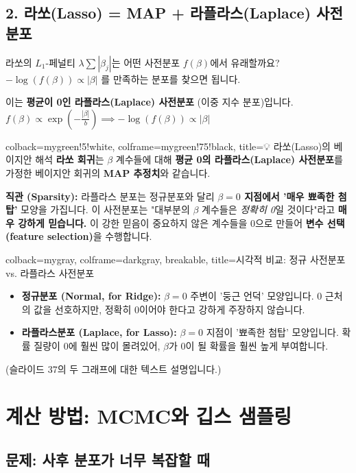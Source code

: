 \documentclass[11pt,a4paper]{book}
\theoremstyle{definition}
\begin{document}
\subsection{2. 라쏘(Lasso) = MAP + 라플라스(Laplace) 사전분포}

라쏘의 $L_1$-페널티 $\lambda \sum |\beta_j|$는 어떤 사전분포 $f(\beta)$에서 유래할까요?
$-\log(f(\beta)) \propto |\beta|$ 를 만족하는 분포를 찾으면 됩니다.

이는 \textbf{평균이 0인 라플라스(Laplace) 사전분포} (이중 지수 분포)입니다.
$f(\beta) \propto \exp(-\frac{|\beta|}{b}) \implies -\log(f(\beta)) \propto |\beta|$

\begin{tcolorbox}{colback=mygreen!5!white, colframe=mygreen!75!black, title=💡 라쏘(Lasso)의 베이지안 해석}
    \textbf{라쏘 회귀}는 $\beta$ 계수들에 대해 \textbf{평균 0의 라플라스(Laplace) 사전분포}를 가정한
    베이지안 회귀의 \textbf{MAP 추정치}와 같습니다.
    
    \textbf{직관 (Sparsity):} 라플라스 분포는 정규분포와 달리 \textbf{$\beta=0$ 지점에서 '매우 뾰족한 첨탑'} 모양을 가집니다.
    이 사전분포는 "대부분의 $\beta$ 계수들은 \textit{정확히 0}일 것이다"라고 \textbf{매우 강하게 믿습니다.}
    이 강한 믿음이 중요하지 않은 계수들을 0으로 만들어 \textbf{변수 선택(feature selection)}을 수행합니다.
\end{tcolorbox}

\begin{tcolorbox}{colback=mygray, colframe=darkgray, breakable, title=시각적 비교: 정규 사전분포 vs. 라플라스 사전분포}
    \begin{itemize}
        \item \textbf{정규분포 (Normal, for Ridge):} $\beta=0$ 주변이 '둥근 언덕' 모양입니다. 0 근처의 값을 선호하지만, 정확히 0이어야 한다고 강하게 주장하지 않습니다.
        
        \item \textbf{라플라스분포 (Laplace, for Lasso):} $\beta=0$ 지점이 '뾰족한 첨탑' 모양입니다. 확률 질량이 0에 훨씬 많이 몰려있어, $\beta$가 0이 될 확률을 훨씬 높게 부여합니다.
    \end{itemize}
    (슬라이드 37의 두 그래프에 대한 텍스트 설명입니다.)
\end{tcolorbox}


\section{계산 방법: MCMC와 깁스 샘플링}

\subsection{문제: 사후 분포가 너무 복잡할 때}
\end{document}
